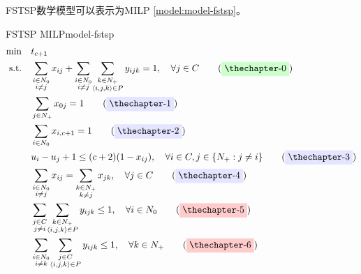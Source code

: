 FSTSP数学模型可以表示为MILP \ref{model:model-fstsp}。

{
\newcommand{\mySubstack}[1]{\mathclap{\substack{#1}}}
\newcommand{\myYellowTag}[1]{\label{#1}\tag{\colorbox{shallow-yellow}{\theequation}}\addtocounter{equation}{1}}
\newcommand{\myRedTag}[1]{\label{#1}\tag{\colorbox{shallow-red}{\theequation}}\addtocounter{equation}{1}}
\newcommand{\myGreenTag}[1]{\label{#1}\tag{\colorbox{shallow-green}{\theequation}}\addtocounter{equation}{1}}
\newcommand{\myPurpleTag}[1]{\label{#1}\tag{\colorbox{shallow-purple}{\theequation}}\addtocounter{equation}{1}}

\begin{model}{FSTSP MILP}{model-fstsp}
\begin{align}
    \min \quad & t_{c + 1}  \label{eq:fstsp-obj}\\
    \text{s.t.} \quad & 
        \sum_{\substack{i\in N_{0}\\i\neq j}}x_{ij}+\sum_{\substack{i\in N_{0}\\ i\neq j}}\!\sum_{\substack{k \in N_{+}\\ \langle i,j,k \rangle \in P}}y_{ijk}=1, \quad \forall j \in C\myGreenTag{eq:fstsp-customer-visit}\\
    \quad & 
        \sum_{j\in N_{+}}x_{0j}=1\myPurpleTag{eq:fstsp-truck-start}\\
    \quad & 
        \sum_{i\in N_{0}}x_{i,c + 1}=1\myPurpleTag{eq:fstsp-truck-return}\\
    \quad & 
        u_i - u_j + 1 \leq (c + 2)(1 - x_{ij}), \quad \forall i \in C, j \in \{N_{+}:j \neq i\}\myPurpleTag{eq:fstsp-truck-mtz}\\
    \quad & 
        \sum_{\substack{i\in N_{0}\\ i \neq j}}x_{ij}=\sum_{\substack{k\in N_{+}\\k\neq j}}x_{jk}, \quad \forall j \in C\myPurpleTag{eq:fstsp-truck-continuity}\\
    \quad & 
        \sum_{\substack{j\in C\\j \neq i}}\!\sum_{\substack{k\in N_{+}\\\langle i,j,k \rangle\in P}}y_{ijk}\leq1, \quad \forall i\in N_{0}\myRedTag{eq:fstsp-drone-land}\\
    \quad & 
        \sum_{\substack{i\in N_{0}\\i\neq k}}\!\sum_{\substack{j\in C\\\langle i,j,k \rangle\in P}}y_{ijk}\leq1, \quad \forall k \in N_{+}\myRedTag{eq:fstsp-drone-takeoff}\\

\end{align}
\end{model}}
